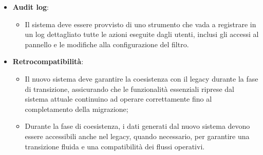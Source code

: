 \begin{itemize}
  \item \textbf{Audit log}:
    \begin{itemize}
      \item Il sistema deve essere provvisto di uno strumento che vada a registrare in un log dettagliato tutte le azioni eseguite dagli utenti, inclusi gli accessi al pannello e le modifiche alla configurazione del filtro.
    \end{itemize}

  \item \textbf{Retrocompatibilità}:
    \begin{itemize}
      \item Il nuovo sistema deve garantire la coesistenza con il legacy durante la fase di transizione, assicurando che le funzionalità essenziali riprese dal sistema attuale continuino ad operare correttamente fino al completamento della migrazione;
      \item Durante la fase di coesistenza, i dati generati dal nuovo sistema devono essere accessibili anche nel legacy, quando necessario, per garantire una transizione fluida e una compatibilità dei flussi operativi.
    \end{itemize}
\end{itemize}

